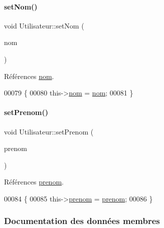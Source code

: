 \paragraph{\texorpdfstring{set\+Nom()}{setNom()}}
{\footnotesize\ttfamily void Utilisateur\+::set\+Nom (\begin{DoxyParamCaption}\item[{Q\+String}]{nom }\end{DoxyParamCaption})}



Références \hyperlink{class_utilisateur_a1096e809aca4b7cf453a7af93cb72502}{nom}.


\begin{DoxyCode}
00079 \{
00080     this->\hyperlink{class_utilisateur_a1096e809aca4b7cf453a7af93cb72502}{nom} = \hyperlink{class_utilisateur_a1096e809aca4b7cf453a7af93cb72502}{nom};
00081 \}
\end{DoxyCode}
\mbox{\label{class_utilisateur_a41e12e2817f4b6ad1fe5ef0f3417caf3}} 
\paragraph{\texorpdfstring{set\+Prenom()}{setPrenom()}}
{\footnotesize\ttfamily void Utilisateur\+::set\+Prenom (\begin{DoxyParamCaption}\item[{Q\+String}]{prenom }\end{DoxyParamCaption})}



Références \hyperlink{class_utilisateur_a1dd0779807b19298f30f39d9c371170f}{prenom}.


\begin{DoxyCode}
00084 \{
00085     this->\hyperlink{class_utilisateur_a1dd0779807b19298f30f39d9c371170f}{prenom} = \hyperlink{class_utilisateur_a1dd0779807b19298f30f39d9c371170f}{prenom};
00086 \}
\end{DoxyCode}


\subsubsection{Documentation des données membres}
\mbox{\label{class_utilisateur_a77b48aa9d1f0ec04c69d45476897fec6}} 
